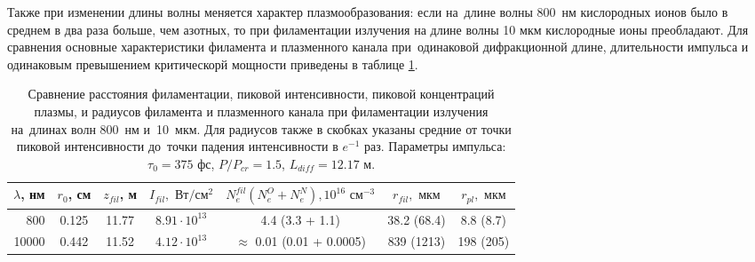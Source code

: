 
Также при изменении длины волны меняется характер плазмообразования: если на~длине волны 800~нм кислородных ионов было в среднем в два раза больше, чем азотных, то при филаментации
излучения на длине волны 10 мкм кислородные ионы преобладают. Для сравнения основные характеристики филамента и плазменного канала при~одинаковой дифракционной длине, длительности импульса
и одинаковым превышением критическорй мощности приведены в таблице \ref{tab:PulsesCompare800vs10000}.

\begin{table}[H]
\begin{center}
\begin{tabular}{|r|c|c|c|c|c|c|}
\hline
$\lambda$, нм & $r_0$, см & $z_{fil}$, м & $I_{fil}, \textrm{ Вт}/\textrm{см}^2$ & $N_e^{fil} (N_e^{O} + N_e^{N}), 10^{16} \textrm{ см}^{-3}$ & $r_{fil}, \textrm{ мкм}$   & $r_{pl}, \textrm{ мкм}$ \\
\hline
800            & 0.125     & 11.77        & $8.91 \cdot 10^{13}$                   & 4.4 (3.3 + 1.1)                                             & 38.2 (68.4)                 & 8.8 (8.7)                \\
\hline
10000          & 0.442     & 11.52        & $4.12 \cdot 10^{13}$                   & $\approx$ 0.01 (0.01 + 0.0005)                             & 839 (1213)                  & 198 (205)                 \\
\hline
\end{tabular}
\\[1ex]
\caption{Сравнение расстояния филаментации, пиковой интенсивности, пиковой концентраций плазмы,
         и радиусов филамента и плазменного канала при филаментации излучения на~длинах волн 800~нм и~10~мкм.
         Для радиусов также в скобках указаны средние от точки пиковой интенсивности до~точки падения интенсивности в $e^{-1}$ раз.
         Параметры импульса: $\tau_0 = 375 \textrm{ фс}$, $P/P_{cr} = 1.5$, $L_{diff} = 12.17 \textrm{ м}$.}
\label{tab:PulsesCompare800vs10000}
\end{center}
\end{table}


